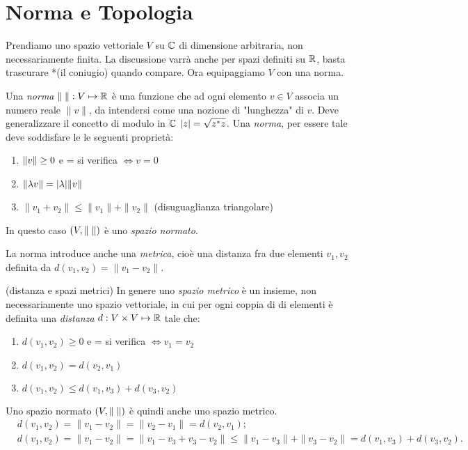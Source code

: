 \chapter{Norma e Topologia}
Prendiamo uno spazio vettoriale $V$ su $\mathbb C$ di dimensione arbitraria, non
necessariamente finita. La discussione varrà anche per spazi definiti su
$\mathbb R$, basta trascurare *(il coniugio) quando compare. Ora equipaggiamo $V$
con una norma.
\begin{definition}
Una \emph{norma} $\| \; \|: V \mapsto \mathbb R$ è una funzione che ad ogni elemento
$v \in V$ associa un numero reale $\|v\|$, da intendersi come una nozione di
"lunghezza" di $v$. Deve generalizzare il concetto di modulo in $\mathbb C$ 
${\left|z\right|} = \sqrt{z^* z}$. Una \emph{norma}, per essere tale deve soddisfare le
le seguenti proprietà:
\begin{enumerate}[1)]
	\item ${\|v\|} \geq 0$ e = si verifica $\iff v = 0$
	\item ${\|\lambda v\|} = {\left|\lambda\right|} {\|v\|}$
	\item $\|v_1 + v_2\| \leq \|v_1\| + \|v_2\|$ (disuguaglianza triangolare)
\end{enumerate}
In questo caso $\left(V, {\|\;\|} \right)$ è uno \emph{spazio normato}.
\end{definition}
La norma introduce anche una \emph{metrica}, cioè una distanza fra due elementi
$v_1, v_2$ definita da $d(v_1, v_2) = \|v_1 - v_2\|$. 
\begin{definition}{(distanza e spazi metrici)}
In genere uno \emph{spazio metrico} è un insieme, non necessariamente uno
spazio vettoriale, in cui per ogni coppia di di elementi è definita una
\emph{distanza} $d: V \times V \mapsto \mathbb R$ tale che:
\begin{enumerate}[1)]
	\item $d(v_1, v_2) \geq 0$ e = si verifica $\iff v_1 = v_2$
	\item $d(v_1, v_2) = d(v_2, v_1)$
	\item $d(v_1, v_2) \leq d(v_1, v_3) + d(v_3, v_2)$
\end{enumerate}
\end{definition}
Uno spazio normato $\left(V, {\|\;\|} \right)$ è quindi anche uno spazio metrico.
\begin{align*}
	&d(v_1, v_2) = \|v_1 - v_2\| = \|v_2 - v_1\| = d(v_2, v_1) ;\\ 
	&d(v_1, v_2) = \|v_1 - v_2\| = \|v_1 - v_3 +v_3 -v_2 \| \leq
	\|v_1 - v_3\| + \|v_3 - v_2\| = d(v_1, v_3) + d(v_3, v_2).
\end{align*}
